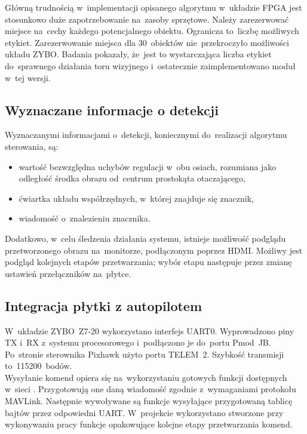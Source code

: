 Główną trudnością w~implementacji opisanego algorytmu w~układzie FPGA jest stosunkowo duże zapotrzebowanie na~zasoby sprzętowe. 
Należy zarezerwować miejsce na~cechy każdego potencjalnego obiektu. 
Ogranicza to~liczbę możliwych etykiet. 
Zarezerwowanie miejsca dla 30~obiektów nie~przekroczyło możliwości układu ZYBO. 
Badania pokazały, że~jest to wystarczająca liczba etykiet do~sprawnego działania toru wizyjnego i~ostatecznie zaimplementowano moduł w~tej wersji.\par
\subsection{Wyznaczane informacje o detekcji}
\label{sec:informacje_o_detekcji}
Wyznaczanymi informacjami o~detekcji, koniecznymi do~realizacji algorytmu sterowania, są:
\begin{itemize}
	\item wartość bezwzględna uchybów regulacji w~obu osiach, rozumiana jako odległość środka obrazu od~centrum prostokąta otaczającego,
	\item ćwiartka układu współrzędnych, w~której znajduje się znacznik,
	\item wiadomość o~znalezieniu znacznika.
\end{itemize}
Dodatkowo, w~celu śledzenia działania systemu, istnieje możliwość podglądu przetworzonego obrazu na~monitorze, podłączonym poprzez HDMI. Możliwy jest podgląd kolejnych etapów przetwarzania; wybór etapu następuje przez zmianę ustawień przełączników na~płytce.\\
\subsection{Integracja płytki z autopilotem}
\label{sec:integracja_plytka_autopilot}
W~układzie ZYBO~Z7-20 wykorzystano interfejs UART0. Wyprowadzono piny TX i~RX z~systemu procesorowego i~podłączono je do~portu Pmod~JB. Po~stronie sterownika Pixhawk użyto portu TELEM~2. Szybkość transmisji to~115200~bodów.\\
Wysyłanie komend opiera się na~wykorzystaniu gotowych funkcji dostępnych w~sieci \cite{github_mavlink}. Przygotowują one daną wiadomość zgodnie z~wymaganiami protokołu MAVLink. Następnie wywoływane są funkcje wysyłające przygotowaną tablicę bajtów przez odpowiedni UART. W~projekcie wykorzystano stworzone przy wykonywaniu pracy \cite{mgr} funkcje opakowujące kolejne etapy przetwarzania komend.
